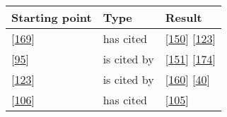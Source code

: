\documentclass[]{book}
\begin{document}
\begin{longtable}[]{@{}lll@{}}
\toprule
\begin{minipage}[b]{0.23\columnwidth}\raggedright\strut
Starting point\strut
\end{minipage} & \begin{minipage}[b]{0.18\columnwidth}\raggedright\strut
Type\strut
\end{minipage} & \begin{minipage}[b]{0.25\columnwidth}\raggedright\strut
Result\strut
\end{minipage}\tabularnewline
\midrule
\endhead
\begin{minipage}[t]{0.23\columnwidth}\raggedright\strut
{[}\protect\hyperlink{ref-souza2015a}{169}{]}\strut
\end{minipage} & \begin{minipage}[t]{0.18\columnwidth}\raggedright\strut
has cited\strut
\end{minipage} & \begin{minipage}[t]{0.25\columnwidth}\raggedright\strut
{[}\protect\hyperlink{ref-plewnia2014a}{150}{]}
{[}\protect\hyperlink{ref-mantyla2015a}{123}{]}\strut
\end{minipage}\tabularnewline
\begin{minipage}[t]{0.23\columnwidth}\raggedright\strut
{[}\protect\hyperlink{ref-khomh2015a}{95}{]}\strut
\end{minipage} & \begin{minipage}[t]{0.18\columnwidth}\raggedright\strut
is cited by\strut
\end{minipage} & \begin{minipage}[t]{0.25\columnwidth}\raggedright\strut
{[}\protect\hyperlink{ref-poo-caamano2016a}{151}{]}
{[}\protect\hyperlink{ref-teixeira2017a}{174}{]}\strut
\end{minipage}\tabularnewline
\begin{minipage}[t]{0.23\columnwidth}\raggedright\strut
{[}\protect\hyperlink{ref-mantyla2015a}{123}{]}\strut
\end{minipage} & \begin{minipage}[t]{0.18\columnwidth}\raggedright\strut
is cited by\strut
\end{minipage} & \begin{minipage}[t]{0.25\columnwidth}\raggedright\strut
{[}\protect\hyperlink{ref-rodriguez2017a}{160}{]}
{[}\protect\hyperlink{ref-cesar2017a}{40}{]}\strut
\end{minipage}\tabularnewline
\begin{minipage}[t]{0.23\columnwidth}\raggedright\strut
{[}\protect\hyperlink{ref-laukkanen2018a}{106}{]}\strut
\end{minipage} & \begin{minipage}[t]{0.18\columnwidth}\raggedright\strut
has cited\strut
\end{minipage} & \begin{minipage}[t]{0.25\columnwidth}\raggedright\strut
{[}\protect\hyperlink{ref-laukkanen2017a}{105}{]}\strut
\end{minipage}\tabularnewline
\bottomrule
\end{longtable}
\end{document}
